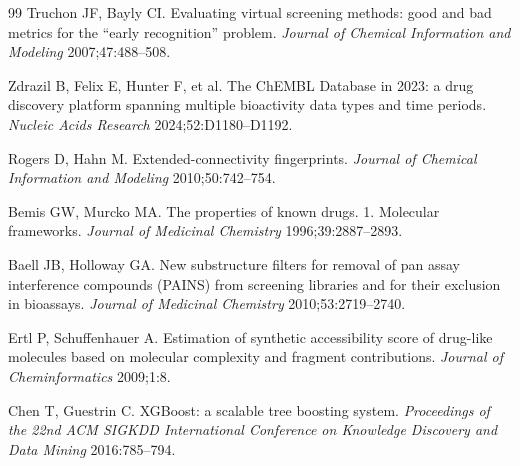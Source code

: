 \documentclass[11pt,a4paper]{article}
\begin{document}
\begin{thebibliography}{99}
Truchon JF, Bayly CI.
Evaluating virtual screening methods: good and bad metrics for the ``early
recognition'' problem.
\textit{Journal of Chemical Information and Modeling} 2007;47:488--508.

Zdrazil B, Felix E, Hunter F, et al.
The ChEMBL Database in 2023: a drug discovery platform spanning multiple
bioactivity data types and time periods.
\textit{Nucleic Acids Research} 2024;52:D1180--D1192.

Rogers D, Hahn M.
Extended-connectivity fingerprints.
\textit{Journal of Chemical Information and Modeling} 2010;50:742--754.

Bemis GW, Murcko MA.
The properties of known drugs. 1. Molecular frameworks.
\textit{Journal of Medicinal Chemistry} 1996;39:2887--2893.

Baell JB, Holloway GA.
New substructure filters for removal of pan assay interference compounds
(PAINS) from screening libraries and for their exclusion in bioassays.
\textit{Journal of Medicinal Chemistry} 2010;53:2719--2740.

Ertl P, Schuffenhauer A.
Estimation of synthetic accessibility score of drug-like molecules based on
molecular complexity and fragment contributions.
\textit{Journal of Cheminformatics} 2009;1:8.

Chen T, Guestrin C.
XGBoost: a scalable tree boosting system.
\textit{Proceedings of the 22nd ACM SIGKDD International Conference on Knowledge
Discovery and Data Mining} 2016:785--794.

\end{thebibliography}

\vspace{0.6cm}
\end{document}
